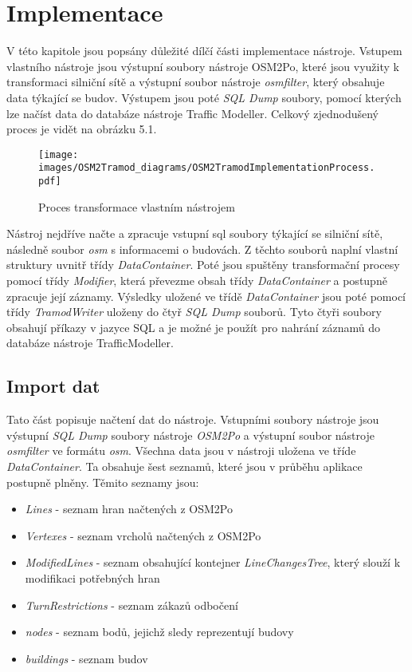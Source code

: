 \chapter{Implementace}

V této kapitole jsou popsány důležité dílčí části implementace nástroje. Vstupem vlastního nástroje jsou výstupní soubory nástroje OSM2Po, které jsou využity k transformaci silniční sítě a výstupní soubor nástroje \textit{osmfilter}, který obsahuje data týkající se budov. Výstupem jsou poté \textit{SQL Dump} soubory, pomocí kterých lze načíst data do databáze nástroje Traffic Modeller. Celkový zjednodušený proces je vidět na obrázku 5.1.

\begin{figure}[htbp]
\centering
\texttt{[image: images/OSM2Tramod\_diagrams/OSM2TramodImplementationProcess.pdf]}
\caption{Proces transformace vlastním nástrojem}
\end{figure}
\vspace{10pt}

Nástroj nejdříve načte a zpracuje vstupní sql soubory týkající se silniční sítě, následně soubor \textit{osm} s informacemi o budovách. Z těchto souborů naplní vlastní struktury uvnitř třídy \textit{DataContainer}. Poté jsou spuštěny transformační procesy pomocí třídy \textit{Modifier}, která převezme obsah třídy \textit{DataContainer} a postupně zpracuje její záznamy. Výsledky uložené ve třídě \textit{DataContainer} jsou poté pomocí třídy \textit{TramodWriter} uloženy do čtyř \textit{SQL Dump} souborů. Tyto čtyři soubory obsahují příkazy v jazyce SQL a je možné je použít pro nahrání záznamů do databáze nástroje TrafficModeller. 

\section{Import dat}

Tato část popisuje načtení dat do nástroje. Vstupními soubory nástroje jsou výstupní \textit{SQL Dump} soubory nástroje \textit{OSM2Po} a výstupní soubor nástroje \textit{osmfilter} ve formátu \textit{osm}. Všechna data jsou v nástroji uložena ve tříde \textit{DataContainer}. Ta obsahuje šest seznamů, které jsou v průběhu aplikace postupně plněny. Těmito seznamy jsou: 

\begin{itemize}
  \item \textit{Lines} - seznam hran načtených z OSM2Po
  \item \textit{Vertexes} - seznam vrcholů načtených z OSM2Po
  \item \textit{ModifiedLines} - seznam obsahující kontejner \textit{LineChangesTree}, který slouží k modifikaci potřebných hran
  \item \textit{TurnRestrictions} - seznam zákazů odbočení
  \item \textit{nodes} - seznam bodů, jejichž sledy reprezentují budovy
  \item \textit{buildings} - seznam budov
\end{itemize}
\vspace{10pt}

